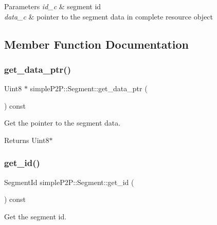 \begin{DoxyParams}{Parameters}
{\em id\+\_\+c} & segment id \\
\hline
{\em data\+\_\+c} & pointer to the segment data in complete resource object \\
\hline
\end{DoxyParams}


\subsection{Member Function Documentation}
\mbox{\label{classsimpleP2P_1_1Segment_ac46dfa3d5857e6ba03919738cc741dab}} 
\subsubsection{\texorpdfstring{get\+\_\+data\+\_\+ptr()}{get\_data\_ptr()}}
{\footnotesize\ttfamily Uint8 $\ast$ simple\+P2\+P\+::\+Segment\+::get\+\_\+data\+\_\+ptr (\begin{DoxyParamCaption}{ }\end{DoxyParamCaption}) const}



Get the pointer to the segment data. 

\begin{DoxyReturn}{Returns}
Uint8$\ast$ 
\end{DoxyReturn}
\mbox{\label{classsimpleP2P_1_1Segment_a668617f24ad0ffd7cdf974cbfff29689}} 
\subsubsection{\texorpdfstring{get\+\_\+id()}{get\_id()}}
{\footnotesize\ttfamily Segment\+Id simple\+P2\+P\+::\+Segment\+::get\+\_\+id (\begin{DoxyParamCaption}{ }\end{DoxyParamCaption}) const}



Get the segment id. 

